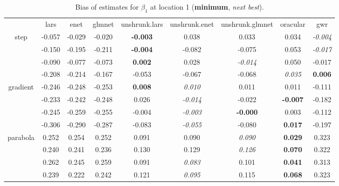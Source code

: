 \documentclass[authoryear, review, 11pt]{elsarticle}
\begin{document}
\begin{table}[ht]
\begin{center}
\begin{tabular}{ccccccccc}
  & lars & enet & glmnet & unshrunk.lars & unshrunk.enet & unshrunk.glmnet & oracular & gwr \\ 
  \cline{2-9}
  \multirow{4}{*}{step} & -0.057 & -0.029 & -0.020 & \textbf{-0.003} & 0.038 & 0.033 & 0.034 & \emph{-0.004} \\ 
  & -0.150 & -0.195 & -0.211 & \textbf{-0.004} & -0.082 & -0.075 & 0.053 & \emph{-0.017} \\ 
  & -0.090 & -0.077 & -0.073 & \textbf{0.002} & 0.028 & \emph{-0.014} & 0.050 & -0.017 \\ 
  & -0.208 & -0.214 & -0.167 & -0.053 & -0.067 & -0.068 & \emph{0.035} & \textbf{0.006} \\ 
  \cline{2-9}
  \multirow{4}{*}{gradient} & -0.246 & -0.248 & -0.253 & \textbf{0.008} & \emph{0.010} & 0.011 & 0.011 & -0.111 \\ 
  & -0.233 & -0.242 & -0.248 & 0.026 & \emph{-0.014} & -0.022 & \textbf{-0.007} & -0.182 \\ 
  & -0.245 & -0.259 & -0.255 & -0.004 & \emph{-0.003} & \textbf{-0.000} & 0.003 & -0.112 \\ 
  & -0.306 & -0.290 & -0.287 & -0.083 & \emph{-0.055} & -0.080 & \textbf{0.017} & -0.197 \\ 
  \cline{2-9}
  \multirow{4}{*}{parabola} & 0.252 & 0.254 & 0.252 & 0.091 & 0.090 & \emph{0.090} & \textbf{0.029} & 0.323 \\ 
  & 0.240 & 0.241 & 0.236 & 0.130 & 0.129 & \emph{0.126} & \textbf{0.070} & 0.322 \\ 
  & 0.262 & 0.245 & 0.259 & 0.091 & \emph{0.083} & 0.101 & \textbf{0.041} & 0.313 \\ 
  & 0.239 & 0.222 & 0.242 & 0.121 & \emph{0.095} & 0.115 & \textbf{0.068} & 0.323 \\ 
  \end{tabular}
\caption{Bias of estimates for $\beta_1$ at location 1 (\textbf{minimum}, \emph{next best}).\label{table:loc1-X1-BiasX}}
\end{center}
\end{table}
\end{document}
